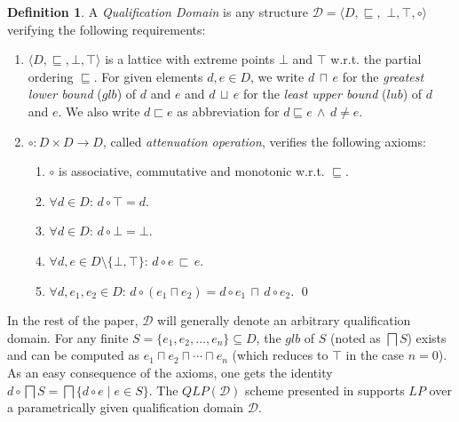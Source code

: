 \documentclass{sigplanconf}
\newcommand{\qdom}{\mathcal{D}} \newcommand{\dqdom}{D \setminus \{\bot\}} \newcommand{\bqdom}{(D \setminus \{\bot\}) \uplus \{?\}}
\newcommand{\qlp}[1]{QLP({#1})} \newcommand{\slp}[2]{SLP({#1,#2})} \newcommand{\sqlp}[2]{SQLP({#1,#2})} \newcommand{\bqlp}[1]{BQLP({#1})} \newcommand{\clp}[1]{CLP({#1})}
\theoremstyle{definition}
\newtheorem{definition}{Definition}
\theoremstyle{plain}
\begin{document}
\begin{definition}  \label{defQD}
A  {\em Qualification Domain} is any structure $\qdom = \langle D, \sqsubseteq,$ $\bot, \top, \circ \rangle$ verifying the following requirements:
\begin{enumerate}
    \item $\langle D, \sqsubseteq, \bot, \top \rangle$ is a lattice with extreme points $\bot$ and $\top$ w.r.t. the partial ordering $\sqsubseteq$. For given elements  $d, e \in D$, we  write $d\, \sqcap\, e$ for the {\em greatest lower bound} ($glb$) of $d$ and $e$ and $d\, \sqcup\, e$ for the {\em least upper bound} ($lub$) of $d$ and $e$. We also write $d \sqsubset e$ as abbreviation for $d \sqsubseteq e\, \land\, d \neq e$.
    \item $\circ : D \times D \rightarrow D$, called {\em attenuation operation}, verifies the following axioms:
        \begin{enumerate}
            \item $\circ$ is associative, commutative and monotonic w.r.t. $\sqsubseteq$.
            \item $\forall d \in D:\, d \circ \top = d$.
            \item $\forall d \in D:\, d \circ \bot = \bot$.
            \item $\forall d, e \in D \setminus \{\bot,\top\}:\, d \circ e\, \sqsubset\, e$.
            \item $\forall d, e_1, e_2 \in D:\, d  \circ (e_1 \sqcap e_2) = d \circ e_1\, \sqcap\, d \circ e_2$. \qed
        \end{enumerate}
\end{enumerate}
\end{definition}

In the rest of the paper, $\qdom$ will generally denote an arbitrary qualification domain. For any finite $S = \{e_{1}, e_{2}, \ldots, e_{n}\} \subseteq D$, the $glb$ of $S$ (noted as $\bigsqcap S$) exists and can be computed as $e_{1} \sqcap e_{2} \sqcap \cdots \sqcap e_{n}$ (which reduces to $\top$ in the case $n = 0$). As an easy consequence of the axioms, one gets the identity $d \circ \bigsqcap S =  \bigsqcap \{d \circ e \mid e \in S\}$.  The $\qlp{\qdom}$ scheme presented in \cite{RR08} supports $LP$ over a parametrically given qualification domain $\qdom$.
\end{document}
